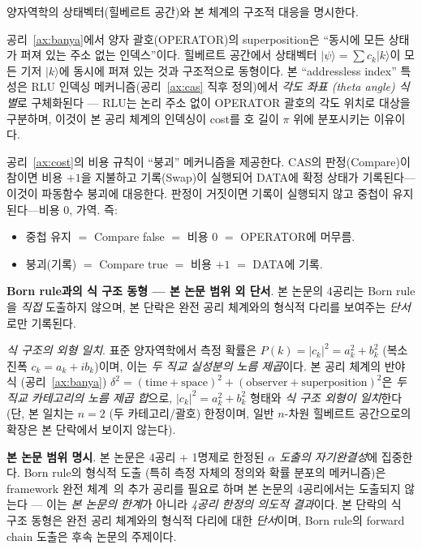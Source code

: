 \documentclass[entropy,article,submit,pdftex,oneauthor]{Definitions/mdpi}
\begin{document}
양자역학의 상태벡터(힐베르트 공간)와 본 체계의 구조적 대응을 명시한다.

공리~\ref{ax:banya}에서 양자 괄호(OPERATOR)의 superposition은 ``동시에 모든 상태가 퍼져 있는 주소 없는 인덱스''이다. 힐베르트 공간에서 상태벡터 $|\psi\rangle = \sum c_k |k\rangle$이 모든 기저 $|k\rangle$에 동시에 퍼져 있는 것과 구조적으로 동형이다. 본 ``addressless index'' 특성은 RLU 인덱싱 메커니즘(공리~\ref{ax:cas} 직후 정의)에서 \emph{각도 좌표 (theta angle) 식별}로 구체화된다 — RLU는 논리 주소 없이 OPERATOR 괄호의 각도 위치로 대상을 구분하며, 이것이 본 공리 체계의 인덱싱이 cost를 호 길이 $\pi$ 위에 분포시키는 이유이다.

공리~\ref{ax:cost}의 비용 규칙이 ``붕괴'' 메커니즘을 제공한다. CAS의 판정(Compare)이 참이면 비용 $+1$을 지불하고 기록(Swap)이 실행되어 DATA에 확정 상태가 기록된다---이것이 파동함수 붕괴에 대응한다. 판정이 거짓이면 기록이 실행되지 않고 중첩이 유지된다---비용 $0$, 가역. 즉:
\begin{itemize}
\item 중첩 유지 $=$ Compare false $=$ 비용 $0$ $=$ OPERATOR에 머무름.
\item 붕괴(기록) $=$ Compare true $=$ 비용 $+1$ $=$ DATA에 기록.
\end{itemize}

\textbf{Born rule과의 식 구조 동형 --- 본 논문 범위 외 단서}. 본 논문의 4공리는 Born rule을 \emph{직접} 도출하지 않으며, 본 단락은 완전 공리 체계와의 형식적 다리를 보여주는 \emph{단서}로만 기록된다.

\emph{식 구조의 외형 일치}. 표준 양자역학에서 측정 확률은 $P(k) = |c_k|^2 = a_k^2 + b_k^2$ (복소 진폭 $c_k = a_k + i b_k$)이며, 이는 \emph{두 직교 실성분의 노름 제곱}이다. 본 공리 체계의 반야식 (공리~\ref{ax:banya}) $\delta^2 = (\text{time}+\text{space})^2 + (\text{observer}+\text{superposition})^2$은 \emph{두 직교 카테고리의 노름 제곱 합}으로, $|c_k|^2 = a_k^2 + b_k^2$ 형태와 \emph{식 구조 외형이 일치}한다 (단, 본 일치는 $n=2$ (두 카테고리/괄호) 한정이며, 일반 $n$-차원 힐베르트 공간으로의 확장은 본 단락에서 보이지 않는다).

\textbf{본 논문 범위 명시}. 본 논문은 4공리 + 1명제로 한정된 \emph{$\alpha$ 도출의 자기완결성}에 집중한다. Born rule의 형식적 도출 (특히 측정 자체의 정의와 확률 분포의 메커니즘)은 framework 완전 체계~\cite{han2026}의 추가 공리를 필요로 하며 본 논문의 4공리에서는 도출되지 않는다 --- 이는 \emph{본 논문의 한계}가 아니라 \emph{4공리 한정의 의도적 결과}이다. 본 단락의 식 구조 동형은 완전 공리 체계와의 형식적 다리에 대한 \emph{단서}이며, Born rule의 forward chain 도출은 후속 논문의 주제이다.
\end{document}
